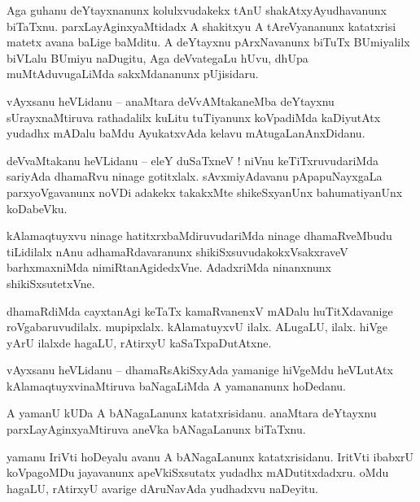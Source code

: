 \documentclass{article}
\begin{document}
\begin{mng}%
Aga guhanu deYtayxnanunx kolulxvudakekx tAnU shakAtxyAyudhavanunx biTaTxnu. parxLayAginxyaMtidadx A 
shakitxyu A tAreVyananunx katatxrisi matetx avana baLige baMditu. A deYtayxnu pArxNavanunx biTuTx 
BUmiyalilx biVLalu BUmiyu naDugitu, Aga deVvategaLu hUvu, dhUpa muMtAduvugaLiMda sakxMdananunx 
pUjisidaru.
\end{mng}


\begin{mng}%
vAyxsanu heVLidanu -- anaMtara deVvAMtakaneMba deYtayxnu sUrayxnaMtiruva rathadalilx kuLitu 
tuTiyanunx koVpadiMda kaDiyutAtx yudadhx mADalu baMdu AyukatxvAda kelavu mAtugaLanAnxDidanu.
\end{mng}

\begin{mng}%
deVvaMtakanu heVLidanu -- eleY duSaTxneV ! niVnu keTiTxruvudariMda sariyAda dhamaRvu ninage 
gotitxlalx. sAvxmiyAdavanu pApapuNayxgaLa parxyoVgavanunx noVDi adakekx takakxMte shikeSxyanUnx 
bahumatiyanUnx koDabeVku.
\end{mng}

\begin{mng}%
kAlamaqtuyxvu ninage hatitxrxbaMdiruvudariMda ninage dhamaRveMbudu tiLidilalx nAnu 
adhamaRdavaranunx shikiSxsuvudakokxVsakxraveV barhxmaxniMda nimiRtanAgidedxVne. AdadxriMda 
ninanxnunx shikiSxsutetxVne.
\end{mng}

\begin{mng}%
dhamaRdiMda cayxtanAgi keTaTx kamaRvanenxV mADalu huTitXdavanige roVgabaruvudilalx. mupipxlalx. 
kAlamatuyxvU ilalx. ALugaLU, ilalx. hiVge yArU ilalxde hagaLU, rAtirxyU kaSaTxpaDutAtxne.
\end{mng}

\begin{mng}%
vAyxsanu heVLidanu -- dhamaRsAkiSxyAda yamanige hiVgeMdu heVLutAtx kAlamaqtuyxvinaMtiruva 
baNagaLiMda A yamananunx hoDedanu.
\end{mng}

\begin{mng}%
A yamanU kUDa A bANagaLanunx katatxrisidanu. anaMtara deYtayxnu parxLayAginxyaMtiruva aneVka 
bANagaLanunx biTaTxnu.
\end{mng}

\begin{mng}%
yamanu IriVti hoDeyalu avanu A bANagaLanunx katatxrisidanu. IritVti ibabxrU koVpagoMDu jayavanunx 
apeVkiSxsutatx yudadhx mADutitxdadxru. oMdu hagaLU, rAtirxyU avarige dAruNavAda yudhadxvu naDeyitu.
\end{mng}
\end{document}
